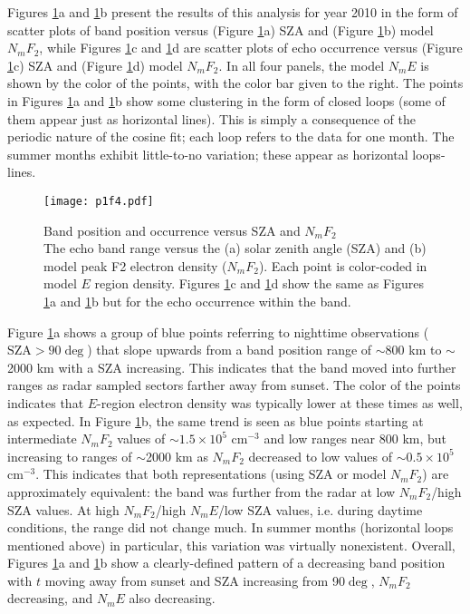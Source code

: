 Figures \ref{fig:scatter}a and \ref{fig:scatter}b present the results of this analysis for year 2010 in the form of scatter plots of band position versus (Figure \ref{fig:scatter}a) SZA and (Figure \ref{fig:scatter}b) model \(N_mF_2\), while Figures \ref{fig:scatter}c and \ref{fig:scatter}d are scatter plots of echo occurrence versus (Figure \ref{fig:scatter}c) SZA and (Figure \ref{fig:scatter}d) model \(N_mF_2\). In all four panels, the model \(N_mE\) is shown by the color of the points, with the color bar given to the right. The points in Figures \ref{fig:scatter}a and \ref{fig:scatter}b show some clustering in the form of closed loops (some of them appear just as horizontal lines). This is simply a consequence of the periodic nature of the cosine fit; each loop refers to the data for one month. The summer months exhibit little-to-no variation; these appear as horizontal loops-lines.

\begin{figure}
	\centering
	\texttt{[image: p1f4.pdf]}
	\caption[Band position and occurrence versus SZA and \(N_mF_2\)]{{\:}Band position and occurrence versus SZA and \(N_mF_2\)\\ The echo band range versus the (a) solar zenith angle (SZA) and (b) model peak F2 electron density (\(N_mF_2\)). Each point is color-coded in model \(E\) region density. Figures \ref{fig:scatter}c and \ref{fig:scatter}d show the same as Figures \ref{fig:scatter}a and \ref{fig:scatter}b but for the  echo occurrence within the band.}
	\label{fig:scatter}
\end{figure}

Figure \ref{fig:scatter}a shows a group of blue points referring to nighttime observations (\(\text{SZA}>90\deg\)) that slope upwards from a band position range of \(\sim\)800 km to \(\sim\)2000 km with a SZA increasing. This indicates that the band moved into further ranges as radar sampled sectors farther away from sunset. The color of the points indicates that \(E\)-region electron density was typically lower at these times as well, as expected. In Figure \ref{fig:scatter}b, the same trend is seen as blue points starting at intermediate \(N_mF_2\) values of \(\sim1.5 \times 10^5\) cm\(^{-3}\) and low ranges near 800 km, but increasing to ranges of \(\sim\)2000 km as \(N_mF_2\) decreased to low values of \(\sim0.5 \times 10^5\) cm\(^{-3}\). This indicates that both representations (using SZA or model \(N_mF_2\)) are approximately equivalent: the band was further from the radar at low \(N_mF_2\)/high SZA values. At high \(N_mF_2\)/high \(N_mE\)/low SZA values, i.e. during daytime conditions, the range did not change much. In summer months (horizontal loops mentioned above) in particular, this variation was virtually nonexistent. Overall, Figures \ref{fig:scatter}a and \ref{fig:scatter}b show a clearly-defined pattern of a decreasing band position with \(t\) moving away from sunset and SZA increasing from 90\(\deg\), \(N_mF_2\) decreasing, and \(N_mE\) also decreasing.

